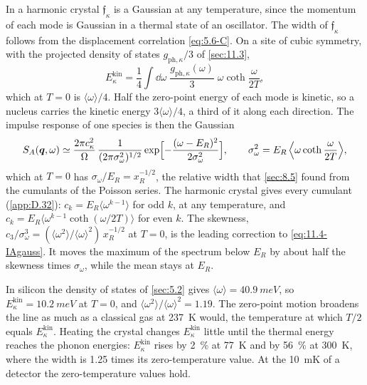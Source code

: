 In a harmonic crystal $\mathfrak{f}_\kappa$ is a Gaussian at any temperature, since the momentum of each mode is Gaussian in a thermal state of an oscillator. The width of $\mathfrak{f}_\kappa$ follows from the displacement correlation \cref{eq:5.6-C}. On a site of cubic symmetry, with the projected density of states $g_{\mathrm{ph},\kappa}/3$ of \cref{sec:11.3},
\begin{equation*}
  E^{\mathrm{kin}}_\kappa = \frac14\int\dd\omega\;\frac{g_{\mathrm{ph},\kappa}(\omega)}{3}\;\omega\coth\frac{\omega}{2T} ,
\end{equation*}
which at $T = 0$ is $\langle\omega\rangle/4$. Half the zero-point energy of each mode is kinetic, so a nucleus carries the kinetic energy $3\langle\omega\rangle/4$, a third of it along each direction. The impulse response of one species is then the Gaussian
\begin{equation}
  S_A(\bm{q},\omega) \simeq \frac{2\pi c_\kappa^2}{\Omega}\,\frac{1}{(2\pi\sigma_\omega^2)^{1/2}}\exp\Bigl[-\frac{(\omega - E_R)^2}{2\sigma_\omega^2}\Bigr] , \qquad
  \sigma_\omega^2 = E_R\,\Bigl\langle\omega\coth\frac{\omega}{2T}\Bigr\rangle ,
  \label{eq:11.4-IAgauss}
\end{equation}
which at $T = 0$ has $\sigma_\omega/E_R = x_R^{-1/2}$, the relative width that \cref{sec:8.5} found from the cumulants of the Poisson series. The harmonic crystal gives every cumulant (\cref{app:D.32}): $c_k = E_R\langle\omega^{k-1}\rangle$ for odd $k$, at any temperature, and $c_k = E_R\langle\omega^{k-1}\coth(\omega/2T)\rangle$ for even $k$. The skewness, $c_3/\sigma_\omega^3 = (\langle\omega^2\rangle/\langle\omega\rangle^2)\,x_R^{-1/2}$ at $T = 0$, is the leading correction to \cref{eq:11.4-IAgauss}. It moves the maximum of the spectrum below $E_R$ by about half the skewness times $\sigma_\omega$, while the mean stays at $E_R$.

In silicon the density of states of \cref{sec:5.2} gives $\langle\omega\rangle = \SI{40.9}{meV}$, so $E^{\mathrm{kin}}_\kappa = \SI{10.2}{meV}$ at $T = 0$, and $\langle\omega^2\rangle/\langle\omega\rangle^2 = 1.19$. The zero-point motion broadens the line as much as a classical gas at \SI{237}{K} would, the temperature at which $T/2$ equals $E^{\mathrm{kin}}_\kappa$. Heating the crystal changes $E^{\mathrm{kin}}_\kappa$ little until the thermal energy reaches the phonon energies: $E^{\mathrm{kin}}_\kappa$ rises by \SI{2}{\percent} at \SI{77}{K} and by \SI{56}{\percent} at \SI{300}{K}, where the width is 1.25 times its zero-temperature value. At the \SI{10}{mK} of a detector the zero-temperature values hold.

